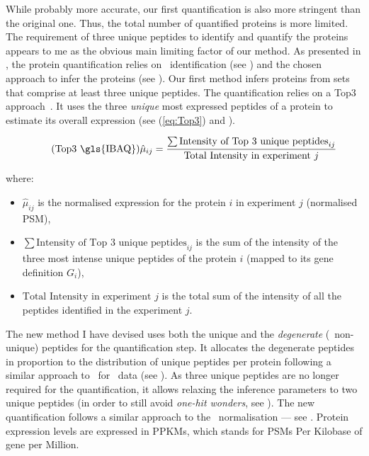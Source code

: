 While probably more accurate,
our first quantification is also more stringent than the original one.
Thus, the total number of quantified proteins is more limited.
The requirement of three unique peptides to identify and quantify the proteins
appears to me as the obvious main limiting factor of our method.
As presented in ,
the protein quantification relies on
\psms\ identification (see )
and the chosen approach to infer the proteins (see ).
Our first method infers proteins from sets that comprise at least three unique peptides.
The quantification relies on a Top3 approach~.
It uses the three \emph{unique} most expressed peptides of a protein
to estimate its overall expression
(see  (\vref{eq:Top3}) and ).

\begin{minipage}{\textwidth}
\begin{equation}
    \tag{Top3 \gls{IBAQ}}\label{eq:Top3}
    \hat{\mu}_{ij}=\frac{\sum \text{Intensity of Top 3 unique peptides} _{ij}}{\text{Total Intensity in experiment } j}
    \raisetag{3\normalbaselineskip}
\end{equation}

where:{\small
\begin{itemize}[topsep=0pt,nosep]
    \item $\hat{\mu}_{ij}$ is the normalised expression for the protein $i$ in experiment $j$ (normalised \gls{PSM}),
    \item $\sum \text{Intensity of Top 3 unique peptides} _{ij}$ is
        the sum of the intensity of the three most intense unique peptides
        of the protein $i$ (mapped to its gene definition $G_i$),
    \item $\text{Total Intensity in experiment } j$ is the total sum of the intensity of all
the peptides identified in the experiment $j$.
\end{itemize}
}
\end{minipage}

The new method I have devised uses both the unique and
the \emph{degenerate} (\ie\ non-unique) peptides
for the quantification step.
It allocates the degenerate peptides
in proportion to the distribution of unique peptides per protein
following a similar approach to \cuffl\ for \Rnaseq\ data (see ).
As three unique peptides are no longer required for the quantification,
it allows relaxing the inference parameters to two unique peptides
(in order to still avoid \emph{one-hit wonders}, see ).
The new quantification follows a similar approach to the \RPKM\ normalisation ---
see .
Protein expression levels are expressed in \glspl{PPKM},
which stands for \glspl{PSM} Per Kilobase of gene per Million.

